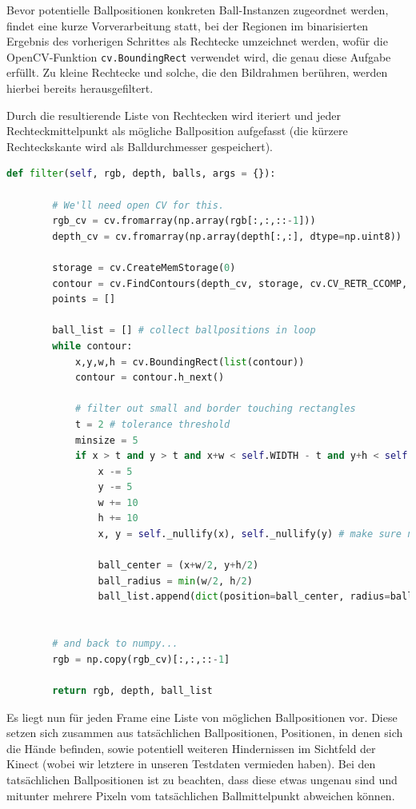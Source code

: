 \documentclass[12pt,a4paper,ngerman]{scrartcl}
\begin{document}
Bevor potentielle Ballpositionen konkreten Ball-Instanzen zugeordnet werden, findet eine kurze Vorverarbeitung statt, bei der Regionen im binarisierten Ergebnis des vorherigen Schrittes als Rechtecke umzeichnet werden, wofür die OpenCV-Funktion \lstinline{cv.BoundingRect} verwendet wird, die genau diese Aufgabe erfüllt. Zu kleine Rechtecke und solche, die den Bildrahmen berühren, werden hierbei bereits herausgefiltert.

Durch die resultierende Liste von Rechtecken wird iteriert und jeder
Rechteckmittelpunkt als mögliche Ballposition aufgefasst (die kürzere Rechteckskante
wird als Balldurchmesser gespeichert).

\vspace{0.5cm}
\begin{lstlisting}[language=Python,caption={RectsFilter.py, Ausschnitt}]
    def filter(self, rgb, depth, balls, args = {}):

        # We'll need open CV for this.
        rgb_cv = cv.fromarray(np.array(rgb[:,:,::-1]))
        depth_cv = cv.fromarray(np.array(depth[:,:], dtype=np.uint8))

        storage = cv.CreateMemStorage(0)
        contour = cv.FindContours(depth_cv, storage, cv.CV_RETR_CCOMP, cv.CV_CHAIN_APPROX_SIMPLE)
        points = []

        ball_list = [] # collect ballpositions in loop
        while contour:
            x,y,w,h = cv.BoundingRect(list(contour))
            contour = contour.h_next()

            # filter out small and border touching rectangles
            t = 2 # tolerance threshold
            minsize = 5
            if x > t and y > t and x+w < self.WIDTH - t and y+h < self.HEIGHT - t and w > minsize and h > minsize:
                x -= 5
                y -= 5
                w += 10
                h += 10
                x, y = self._nullify(x), self._nullify(y) # make sure nothing is smaller than 0

                ball_center = (x+w/2, y+h/2)
                ball_radius = min(w/2, h/2)
                ball_list.append(dict(position=ball_center, radius=ball_radius))


        # and back to numpy...
        rgb = np.copy(rgb_cv)[:,:,::-1]

        return rgb, depth, ball_list
\end{lstlisting}

Es liegt nun für jeden Frame eine Liste von möglichen Ballpositionen vor. Diese setzen sich zusammen aus tatsächlichen Ballpositionen, Positionen, in denen sich die Hände befinden, sowie potentiell weiteren Hindernissen im Sichtfeld der Kinect (wobei wir letztere in unseren Testdaten vermieden haben). Bei den tatsächlichen Ballpositionen ist zu beachten, dass diese etwas ungenau sind und mitunter mehrere Pixeln vom tatsächlichen Ballmittelpunkt abweichen können.
\end{document}
